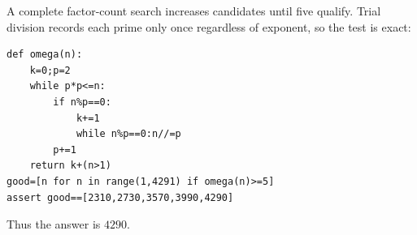 A complete factor-count search increases candidates until five qualify. Trial division records each prime only once regardless of exponent, so the test is exact:
\begin{verbatim}
def omega(n):
    k=0;p=2
    while p*p<=n:
        if n%p==0:
            k+=1
            while n%p==0:n//=p
        p+=1
    return k+(n>1)
good=[n for n in range(1,4291) if omega(n)>=5]
assert good==[2310,2730,3570,3990,4290]
\end{verbatim}
Thus the answer is $\boxed{4290}$.
